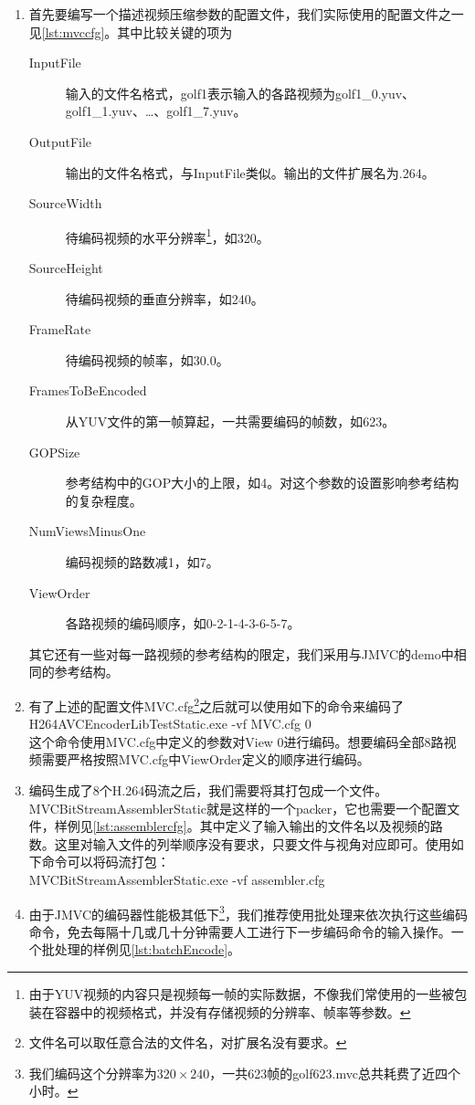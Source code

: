 \begin{enumerate}
\item 首先要编写一个描述视频压缩参数的配置文件，我们实际使用的配置文件之一见\autoref{lst:mvccfg}。其中比较关键的项为
\begin{description}
\item[InputFile] 输入的文件名格式，golf1表示输入的各路视频为golf1\_0.yuv、golf1\_1.yuv、\dots、golf1\_7.yuv。
\item[OutputFile] 输出的文件名格式，与InputFile类似。输出的文件扩展名为.264。
\item[SourceWidth] 待编码视频的水平分辨率\footnote{由于YUV视频的内容只是视频每一帧的实际数据，不像我们常使用的一些被包装在容器中的视频格式，并没有存储视频的分辨率、帧率等参数。}，如320。
\item[SourceHeight] 待编码视频的垂直分辨率，如240。
\item[FrameRate] 待编码视频的帧率，如30.0。
\item[FramesToBeEncoded] 从YUV文件的第一帧算起，一共需要编码的帧数，如623。
\item[GOPSize] 参考结构中的GOP大小的上限，如4。对这个参数的设置影响参考结构的复杂程度。
\item[NumViewsMinusOne] 编码视频的路数减1，如7。
\item[ViewOrder] 各路视频的编码顺序，如0-2-1-4-3-6-5-7。
\end{description}
其它还有一些对每一路视频的参考结构的限定，我们采用与JMVC的demo中相同的参考结构。
\item 有了上述的配置文件MVC.cfg\footnote{文件名可以取任意合法的文件名，对扩展名没有要求。}之后就可以使用如下的命令来编码了\\H264AVCEncoderLibTestStatic.exe -vf MVC.cfg 0\\这个命令使用MVC.cfg中定义的参数对View 0进行编码。想要编码全部8路视频需要严格按照MVC.cfg中ViewOrder定义的顺序进行编码。
\item 编码生成了8个H.264码流之后，我们需要将其打包成一个文件。MVCBitStreamAssemblerStatic就是这样的一个packer，它也需要一个配置文件，样例见\autoref{lst:assemblercfg}。其中定义了输入输出的文件名以及视频的路数。这里对输入文件的列举顺序没有要求，只要文件与视角对应即可。使用如下命令可以将码流打包：\\MVCBitStreamAssemblerStatic.exe -vf assembler.cfg
\item 由于JMVC的编码器性能极其低下\footnote{我们编码这个分辨率为$320\times 240$，一共623帧的golf623.mvc总共耗费了近四个小时。}，我们推荐使用批处理来依次执行这些编码命令，免去每隔十几或几十分钟需要人工进行下一步编码命令的输入操作。一个批处理的样例见\autoref{lst:batchEncode}。
\end{enumerate}

